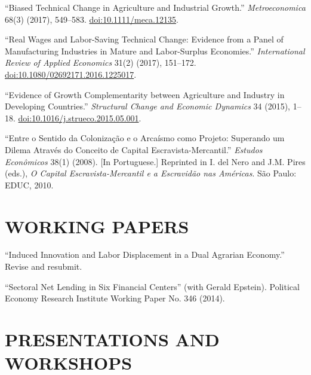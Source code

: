 \documentclass[10pt]{article}
\begin{document}
``Biased Technical Change in Agriculture and Industrial Growth.''
\textit{Metroeconomica} 68(3) (2017), 549--583.
\href{https://doi.org/10.1111/meca.12135}{doi:10.1111/meca.12135}.

``Real Wages and Labor-Saving Technical Change: Evidence from a Panel
of Manufacturing Industries in Mature and Labor-Surplus Economies.''
\textit{International Review of Applied Economics} 31(2) (2017),
151--172.
\href{https://doi.org/10.1080/02692171.2016.1225017}
{doi:10.1080/02692171.2016.1225017}.

``Evidence of Growth Complementarity between Agriculture and Industry
in Developing Countries.'' \textit{Structural Change and Economic
Dynamics} 34 (2015), 1--18.
\href{https://doi.org/10.1016/j.strueco.2015.05.001}
{doi:10.1016/j.strueco.2015.05.001}.

``Entre o Sentido da Coloniza\c{c}\~ao e o Arca\'ismo como Projeto:
Superando um Dilema Atrav\'es do Conceito de Capital
Escravista-Mercantil.'' \textit{Estudos Econ\^omicos} 38(1) (2008).
[In Portuguese.] Reprinted in I. del Nero and J.M. Pires (eds.),
\textit{O Capital Escravista-Mercantil e a Escravid\~ao nas Am\'ericas}.
S\~ao Paulo: EDUC, 2010.

\newpage
\section{WORKING PAPERS}

``Induced Innovation and Labor Displacement in a Dual Agrarian
Economy.'' Revise and resubmit.

``Sectoral Net Lending in Six Financial Centers'' (with Gerald Epstein).
Political Economy Research Institute Working Paper No. 346 (2014).

\section{PRESENTATIONS AND WORKSHOPS}
\end{document}
